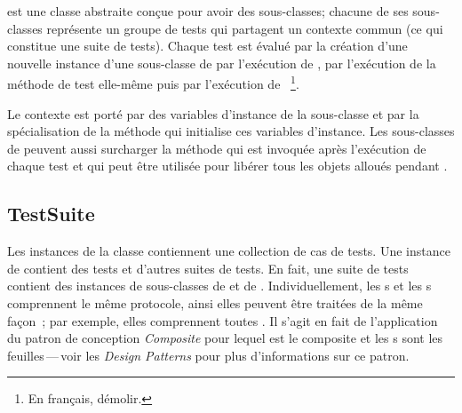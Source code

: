 \documentclass[a4paper,10pt,twoside]{book}
\begin{document}
 est une classe abstraite conçue pour avoir des sous-classes; chacune de ses 
sous-classes représente un groupe de tests qui partagent un contexte commun (ce qui constitue une 
suite de tests). 
Chaque test est évalué par la création d'une nouvelle instance d'une sous-classe de  
par l'exécution de , par l'exécution de la méthode de test elle-même puis 
par l'exécution de ~\footnote{En français, démolir.}.

Le contexte est porté par des variables d'instance de la sous-classe et par la spécialisation de 
la méthode  qui initialise ces variables d'instance.  Les sous-classes de  
peuvent aussi surcharger la méthode  qui est invoquée après l'exécution de chaque 
test et qui peut être utilisée pour libérer tous les objets alloués pendant .
\subsection{TestSuite}


Les instances de la classe  contiennent une collection de cas de tests. 
Une instance de  contient des tests et d'autres suites de tests. En fait, une 
suite de tests contient des instances de sous-classes de  et de .
Individuellement, les s et les s comprennent le même protocole, 
ainsi elles peuvent être traitées de la même façon~; par exemple, elles comprennent toutes .
Il s'agit en fait de l'application du patron de conception 
\emph{Composite}
pour lequel  est le composite et les s sont les 
feuilles\,---\,voir les \textit{Design Patterns} pour plus d'informations sur ce patron\cite{Gamm95a}.
\end{document}
